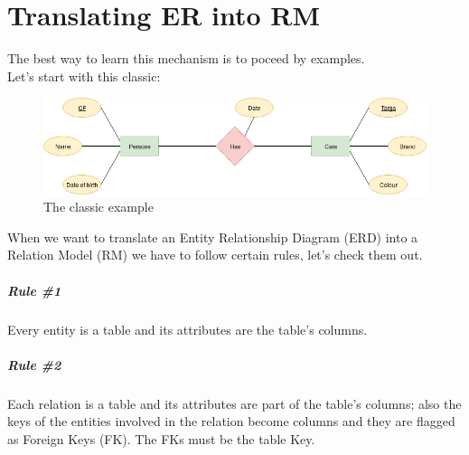 \documentclass[class=book, crop=false, oneside]{standalone}
\begin{document}

\chapter*{Translating ER into RM}
The best way to learn this mechanism is to poceed by examples.\\
Let's start with this classic:

\begin{figure}[H]
	\centering
	\includegraphics[width=\textwidth,keepaspectratio]{diagram1_00.png}
	\caption{The classic example}
	\label{diagram1_00}
\end{figure}

When we want to translate an Entity Relationship Diagram (ERD) into a Relation Model (RM) we have to follow certain rules, let's check them out.
\paragraph*{Rule \#1} Every entity is a table and its attributes are the table's columns.
\paragraph*{Rule \#2} Each relation is a table and its attributes are part of the table's columns; also the keys of the entities involved in the relation become columns and they are flagged as Foreign Keys (FK). The FKs must be the table Key.\\
\end{document}
